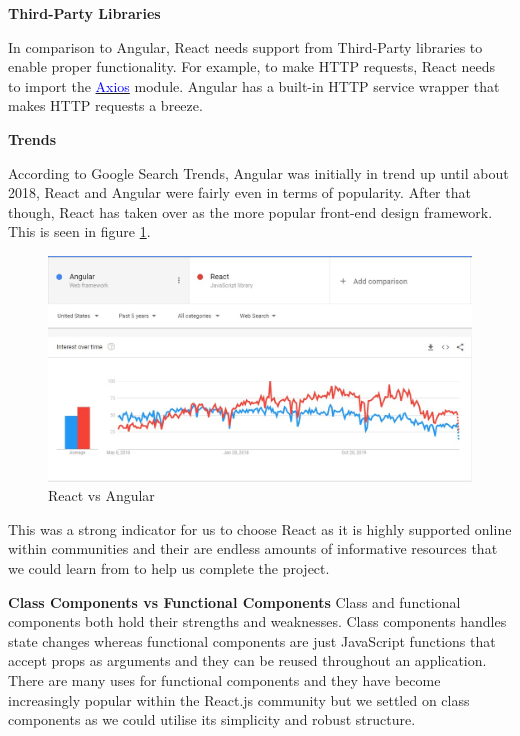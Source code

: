 \textbf{Third-Party Libraries}

In comparison to Angular, React needs support from Third-Party libraries to enable proper functionality. For example, to make HTTP requests, React needs to import the \href{https://github.com/axios/axios}{\textcolor{blue}{Axios}} module. Angular has a built-in HTTP service wrapper that makes HTTP requests a breeze.

\textbf{Trends}

According to Google Search Trends, Angular was initially in trend up until about 2018, React and Angular were fairly even in terms of popularity. After that though, React has taken over as the more popular front-end design framework. This is seen in figure \ref{fig:React vs Angular}.

\begin{figure}[H]
  \centering
  \includegraphics[scale=0.45]{img/react_vs_angular.jpg}
  \caption{React vs Angular}
  \label{fig:React vs Angular}
\end{figure}

This was a strong indicator for us to choose React as it is highly supported online within communities and their are endless amounts of informative resources that we could learn from to help us complete the project.

\item \textbf{Class Components vs Functional Components}
Class and functional components both hold their strengths and weaknesses. Class components handles state changes whereas functional components are just JavaScript functions that accept props as arguments and they can be reused throughout an application. There are many uses for functional components and they have become increasingly popular within the React.js community but we settled on class components as we could utilise its simplicity and robust structure.

